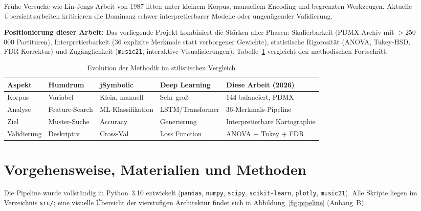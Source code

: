 \documentclass[12pt,a4paper]{article}
\theoremstyle{definition}
\begin{document}
\noindent Frühe Versuche wie Lin-Jengs Arbeit von 1987\autocite{LinJeng1987} litten unter kleinem Korpus, manuellem Encoding und begrenzten Werkzeugen. Aktuelle Übersichtsarbeiten kritisieren die Dominanz schwer interpretierbarer Modelle oder ungenügender Validierung.\autocite{Simonetta2025}

\textbf{Positionierung dieser Arbeit:} Das vorliegende Projekt kombiniert die Stärken aller Phasen: Skalierbarkeit (PDMX-Archiv mit $>$250\,000 Partituren\autocite{PDMX2024}), Interpretierbarkeit (36 explizite Merkmale statt verborgener Gewichte), statistische Rigorosität (ANOVA, Tukey-HSD, FDR-Korrektur) und Zugänglichkeit (\texttt{music21}\autocite{Cuthbert2010}, interaktive Visualisierungen). Tabelle~\ref{tab:evolution} vergleicht den methodischen Fortschritt.

\begin{table}[H]
    \centering
    \caption{Evolution der Methodik im stilistischen Vergleich}\label{tab:evolution}
    \begin{tabular}{p{2.2cm}p{2.5cm}p{2.5cm}p{2.5cm}p{4.5cm}}
        \toprule
        \textbf{Aspekt} & \textbf{Humdrum} & \textbf{jSymbolic} & \textbf{Deep Learning} & \textbf{Diese Arbeit (2026)} \\
        \midrule
        Korpus & Variabel & Klein, manuell & Sehr groß & 144 balanciert, PDMX \\
        Analyse & Feature-Search & ML-Klassifikation & LSTM/Transformer & 36-Merkmals-Pipeline \\
        Ziel & Muster-Suche & Accuracy & Generierung & Interpretierbare Kartographie \\
        Validierung & Deskriptiv & Cross-Val & Loss Function & ANOVA + Tukey + FDR \\
        \bottomrule
    \end{tabular}
\end{table}

\section{Vorgehensweise, Materialien und Methoden}
Die Pipeline wurde vollständig in Python~3.10 entwickelt (\texttt{pandas}, \texttt{numpy}, \texttt{scipy}, \texttt{scikit-learn}, \texttt{plotly}, \texttt{music21}). Alle Skripte liegen im Verzeichnis \texttt{src/}; eine visuelle Übersicht der vierstufigen Architektur findet sich in Abbildung~\ref{fig:pipeline} (Anhang~B).
\end{document}

